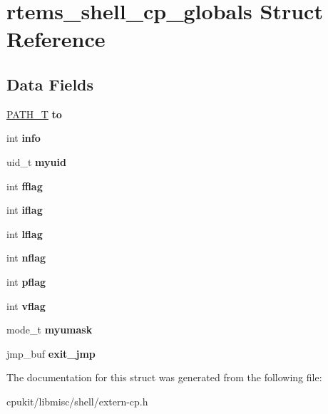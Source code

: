 \hypertarget{structrtems__shell__cp__globals}{}\section{rtems\+\_\+shell\+\_\+cp\+\_\+globals Struct Reference}
\label{structrtems__shell__cp__globals}
\subsection*{Data Fields}
\begin{DoxyCompactItemize}
\item 
\mbox{\label{structrtems__shell__cp__globals_a4bbd4a00e0b5beada502fdff3fd804ec}} 
\mbox{\hyperlink{structPATH__T}{P\+A\+T\+H\+\_\+T}} {\bfseries to}
\item 
\mbox{\label{structrtems__shell__cp__globals_a67049dcbe8993935b189c04cbbcafe4c}} 
int {\bfseries info}
\item 
\mbox{\label{structrtems__shell__cp__globals_a8843136acfc66c7420700f7abf9b2dbe}} 
uid\+\_\+t {\bfseries myuid}
\item 
\mbox{\label{structrtems__shell__cp__globals_a989e6b5b521d6809b5dab5c86f44df9c}} 
int {\bfseries fflag}
\item 
\mbox{\label{structrtems__shell__cp__globals_a57834997e607e41ca31ef4f6fac46143}} 
int {\bfseries iflag}
\item 
\mbox{\label{structrtems__shell__cp__globals_a05a159c4fbb5eb7341bf63e09d29a555}} 
int {\bfseries lflag}
\item 
\mbox{\label{structrtems__shell__cp__globals_a3c1a0d3f91687e8becf021d5755f8781}} 
int {\bfseries nflag}
\item 
\mbox{\label{structrtems__shell__cp__globals_a00690628d6402acf87eca724c1c51a3b}} 
int {\bfseries pflag}
\item 
\mbox{\label{structrtems__shell__cp__globals_a162748bb5c259c21ecd40d5a1cfd46f2}} 
int {\bfseries vflag}
\item 
\mbox{\label{structrtems__shell__cp__globals_aa0e8b7fcb14a1582a378215dbb618dde}} 
mode\+\_\+t {\bfseries myumask}
\item 
\mbox{\label{structrtems__shell__cp__globals_af515cf1cca879e2ce9c2eefb7642f5c6}} 
jmp\+\_\+buf {\bfseries exit\+\_\+jmp}
\end{DoxyCompactItemize}


The documentation for this struct was generated from the following file\+:\begin{DoxyCompactItemize}
\item 
cpukit/libmisc/shell/extern-\/cp.\+h\end{DoxyCompactItemize}
